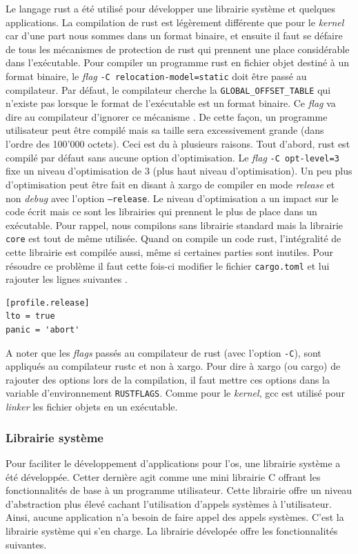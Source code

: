 Le langage rust a été utilisé pour développer une librairie système et quelques
applications. La compilation de rust est légèrement différente que pour le
\textit{kernel} car d'une part nous sommes dans un format binaire, et ensuite
il faut se défaire de tous les mécanismes de protection de rust qui prennent
une place considérable dans l'exécutable. Pour compiler un programme rust
en fichier objet destiné à un format binaire, le \textit{flag}
\texttt{-C relocation-model=static} doit être passé au compilateur.
Par défaut, le compilateur cherche la \texttt{GLOBAL_OFFSET_TABLE}
qui n'existe pas lorsque le format de l'exécutable est un format binaire.
Ce \textit{flag} va dire au compilateur d'ignorer ce mécanisme \cite{ref25}.
De cette façon, un programme utilisateur peut être compilé mais sa taille sera
excessivement grande (dans l'ordre des 100'000 octets). Ceci est du à plusieurs
raisons. Tout d'abord, rust est compilé par défaut sans aucune option d'optimisation.
Le \textit{flag} \texttt{-C opt-level=3} fixe un niveau d'optimisation
de 3 (plus haut niveau d'optimisation). Un peu plus d'optimisation peut être
fait en disant à xargo de compiler en mode \textit{release} et non \textit{debug}
avec l'option \texttt{--release}. Le niveau d'optimisation a un impact
sur le code écrit mais ce sont les librairies qui prennent le plus de place dans
un exécutable. Pour rappel, nous compilons sans librairie standard mais la librairie
\texttt{core} est tout de même utilisée. Quand on compile un code rust,
l'intégralité de cette librairie est compilée aussi, même si certaines parties
sont inutiles. Pour résoudre ce problème il faut cette fois-ci modifier le fichier
\texttt{cargo.toml} et lui rajouter les lignes suivantes \cite{ref26}.

\begin{verbatim}
[profile.release]
lto = true
panic = 'abort'
\end{verbatim}

A noter que les \textit{flags} passés au compilateur de rust (avec l'option
\texttt{-C}), sont appliqués au compilateur rustc et non à xargo. Pour
dire à xargo (ou cargo) de rajouter des options lors de la compilation, il faut
mettre ces options dans la variable d'environnement \texttt{RUSTFLAGS}.
Comme pour le \textit{kernel}, \acrshort{gcc} est utilisé pour \textit{linker}
les fichier objets en un exécutable.

\subsubsection{Librairie système}
Pour faciliter le développement d'applications pour l'\acrshort{os}, une librairie
système a été développée. Cetter dernière agit comme une mini librairie C offrant
les fonctionnalités de base à un programme utilisateur. Cette librairie offre
un niveau d'abstraction plus élevé cachant l'utilisation d'appels systèmes
à l'utilisateur. Ainsi, aucune application n'a besoin de faire appel des appels
systèmes. C'est la librairie système qui s'en charge. La librairie dévelopée
offre les fonctionnalités suivantes.

